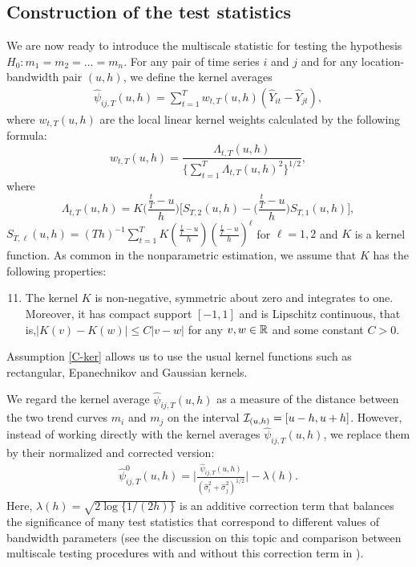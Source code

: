 \documentclass[a4paper,12pt]{article}
\begin{document}
\subsection{Construction of the test statistics}\label{subsec:test:stat}

We are now ready to introduce the multiscale statistic for testing the hypothesis \linebreak $H_0: m_1 = m_2 = \ldots = m_n$. For any pair of time series $i$ and $j$ and for any location-bandwidth pair $(u, h)$, we define the kernel averages
\begin{align}\label{eq:psi_hat_ij}
 \widehat{\psi}_{ij,T}(u,h) = \sum\limits_{t=1}^T w_{t,T}(u,h)(\widehat{Y}_{it} - \widehat{Y}_{jt}),
 \end{align}
where $w_{t,T}(u,h)$ are the local linear kernel weights calculated by the following formula:
\begin{equation}\label{eq:weights}
w_{t,T}(u,h) = \frac{\Lambda_{t,T}(u,h)}{ \{\sum\nolimits_{t=1}^T \Lambda_{t,T}(u,h)^2 \}^{1/2} }, 
\end{equation}
where
\[ \Lambda_{t,T}(u,h) = K\Big(\frac{\frac{t}{T}-u}{h}\Big) \Big[ S_{T,2}(u,h) - \Big(\frac{\frac{t}{T}-u}{h}\Big) S_{T,1}(u,h) \Big], \]
$S_{T,\ell}(u,h) = (Th)^{-1} \sum\nolimits_{t=1}^T K(\frac{\frac{t}{T}-u}{h}) (\frac{\frac{t}{T}-u}{h})^\ell$ for $\ell = 1,2$ and $K$ is a kernel function. As common in the nonparametric estimation, we assume that $K$ has the following properties: 
\begin{enumerate}[label=(C\arabic*),leftmargin=1.05cm]
\setcounter{enumi}{10}
\item \label{C-ker} The kernel $K$ is non-negative, symmetric about zero and integrates to one. Moreover, it has compact support $[-1,1]$ and is Lipschitz continuous, that is,\linebreak $|K(v) - K(w)| \le C |v-w|$ for any $v,w \in \mathbb{R}$ and some constant $C > 0$. 
\end{enumerate} 
Assumption \ref{C-ker} allows us to use the usual kernel functions such as rectangular, Epanechnikov and Gaussian kernels.

We regard the kernel average $\widehat{\psi}_{ij,T}(u,h)$ as a measure of the distance between the two trend curves $m_i$ and $m_j$ on the interval $\mathcal{I}_{(u, h)} = [u-h,u+h]$. However, instead of working directly with the kernel averages $\widehat{\psi}_{ij,T}(u,h)$, we replace them by their normalized and corrected version:
\begin{align}\label{eq:psi_zero_ij}
\hat{\psi}^0_{ij,T}(u, h) =  \Big|\frac{\widehat{\psi}_{ij,T}(u,h)}{(\widehat{\sigma}_i^2 + \widehat{\sigma}_j^2)^{1/2}}\Big| - \lambda(h).
\end{align}
Here, $\lambda(h) = \sqrt{2 \log \{ 1/(2h) \}}$ is an additive correction term that balances the significance of many test statistics that correspond to different values of bandwidth parameters (see the discussion on this topic and comparison between multiscale testing procedures with and without this correction term in \citet{KhismatullinaVogt2020}).
\end{document}
